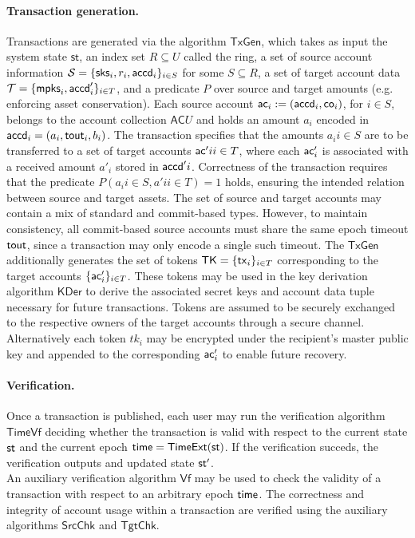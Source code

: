 \paragraph*{Transaction generation.} Transactions are generated via the algorithm $\mathsf{TxGen}$, which takes as input the system state $\mathsf{st}$, an index set $R \subseteq U$ called the ring, a set of source account information  $\mathcal{S} = \{ \mathsf{sks}_i, r_i, \mathsf{accd}_i \}_{i \in S}$ for some $S \subseteq R$, a set of target account data $\mathcal{T} = \{ \mathsf{mpks}_i, \mathsf{accd}'_i \}_{i \in T}$, and a predicate $P$ over source and target amounts (e.g. enforcing asset conservation). Each source account $\mathsf{ac}_i := (\mathsf{accd}_i, \mathsf{co}_i)$, for $i \in S$, belongs to the account collection $\mathsf{AC}U$ and holds an amount $a_i$ encoded in $\mathsf{accd}_i = (a_i, \mathsf{tout}_i, b_i)$. The transaction specifies that the amounts ${ a_i }{i \in S}$ are to be transferred to a set of target accounts ${ \mathsf{ac}'i }{i \in T}$, where each $\mathsf{ac}'_i$ is associated with a received amount $a'_i$ stored in $\mathsf{accd}'i$. Correctness of the transaction requires that the predicate $P({ a_i }{i \in S}, { a'i }{i \in T}) = 1$ holds, ensuring the intended relation between source and target assets. The set of source and target accounts may contain a mix of standard and commit-based types. However, to maintain consistency, all commit-based source accounts must share the same epoch timeout $\mathsf{tout}$, since a transaction may only encode a single such timeout.
 The $\mathsf{TxGen}$ additionally generates the set of tokens $\mathsf{TK} = \{ \mathsf{tx}_i \}_{i \in T}$ corresponding to the target accounts $\{ \mathsf{ac}'_i \}_{i \in T}$. These tokens may be used in the key derivation algorithm $\mathsf{KDer}$ to derive the associated secret keys and account data tuple necessary for future transactions. Tokens are assumed to be securely exchanged to the respective owners of the target accounts through a secure channel. Alternatively each token $tk_i$ may be encrypted under the recipient's master public key and  appended to the corresponding $\mathsf{ac}'_i$ to enable future recovery. \\

\paragraph*{Verification.}
Once a transaction is published, each user may run the verification algorithm $\mathsf{TimeVf}$ deciding whether the transaction is valid with respect to the current state $\st$ and the current epoch $\time = \mathsf{TimeExt}(\st)$. If the verification succeds, the verification outputs and updated state $\st'$. \\
An auxiliary verification algorithm $\mathsf{Vf}$ may be used to check the validity of a transaction with respect to an arbitrary epoch $\mathsf{time}$.
The correctness and integrity of account usage within a transaction are verified using the auxiliary algorithms $\mathsf{SrcChk}$ and $\mathsf{TgtChk}$.

